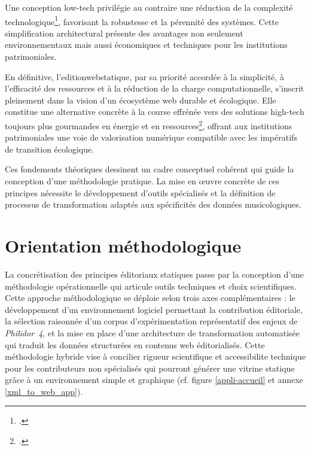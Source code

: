 Une conception low-tech privilégie au contraire une réduction de la complexité technologique\footcite{lebasApprochesLowtechInnovation2024}, favorisant la robustesse et la pérennité des systèmes. Cette simplification architectural présente des avantages non seulement environnementaux mais aussi économiques et techniques pour les institutions patrimoniales.

En définitive, l'\gls{editionwebstatique}, par sa priorité accordée à la simplicité, à l'efficacité des ressources et à la réduction de la charge computationnelle, s'inscrit pleinement dans la vision d'un écosystème web durable et écologique. Elle constitue une alternative concrète à la course effrénée vers des solutions high-tech toujours plus gourmandes en énergie et en ressources\footcite{bihouixTransitionEnergetiquePeutelle2019}, offrant aux institutions patrimoniales une voie de valorisation numérique compatible avec les impératifs de transition écologique. 

Ces fondements théoriques dessinent un cadre conceptuel cohérent qui guide la conception d'une méthodologie pratique. La mise en œuvre concrète de ces principes nécessite le développement d'outils spécialisés et la définition de processus de transformation adaptés aux spécificités des données musicologiques.

\section{Orientation méthodologique}

La concrétisation des principes éditoriaux statiques passe par la conception d'une méthodologie opérationnelle qui articule outils techniques et choix scientifiques. Cette approche méthodologique se déploie selon trois axes complémentaires : le développement d'un environnement logiciel permettant la contribution éditoriale, la sélection raisonnée d'un corpus d'expérimentation représentatif des enjeux de \textit{Philidor~4}, et la mise en place d'une architecture de transformation automatisée qui traduit les données structurées en contenus web éditorialisés. Cette méthodologie hybride vise à concilier rigueur scientifique et \gls{accessibilite} technique pour les contributeurs non spécialisés qui pourront générer une vitrine statique grâce à un environnement simple et graphique (cf. figure \ref{appli-accueil} et annexe \ref{xml_to_web_app}).

